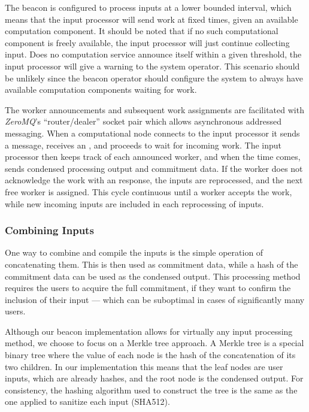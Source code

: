 The beacon is configured to process inputs at a lower bounded interval, which means that the input processor will send work at fixed times, given an available computation component.
It should be noted that if no such computational component is freely available, the input processor will just continue collecting input.
Does no computation service announce itself within a given threshold, the input processor will give a warning to the system operator.
This scenario should be unlikely since the beacon operator should configure the system to always have available computation components waiting for work.

The worker announcements and subsequent work assignments are facilitated with \textit{ZeroMQ}'s \enquote{router/dealer} socket pair which allows asynchronous addressed messaging.
When a computational node connects to the input processor it sends a  message, receives an , and proceeds to wait for incoming work.
The input processor then keeps track of each announced worker, and when the time comes, sends condensed processing output and commitment data.
If the worker does not acknowledge the work with an  response, the inputs are reprocessed, and the next free worker is assigned.
This cycle continuous until a worker accepts the work, while new incoming inputs are included in each reprocessing of inputs.

\subsubsection{Combining Inputs}%
\label{ssub:combining_inputs}
One way to combine and compile the inputs is the simple operation of concatenating them.
This is then used as commitment data, while a hash of the commitment data can be used as the condensed output.
This processing method requires the users to acquire the full commitment, if they want to confirm the inclusion of their input --- which can be suboptimal in cases of significantly many users.

Although our beacon implementation allows for virtually any input processing method, we choose to focus on a Merkle tree approach.
A Merkle tree is a special binary tree where the value of each node is the hash of the concatenation of its two children.
In our implementation this means that the leaf nodes are user inputs, which are already hashes, and the root node is the condensed output.
For consistency, the hashing algorithm used to construct the tree is the same as the one applied to sanitize each input (SHA512).


